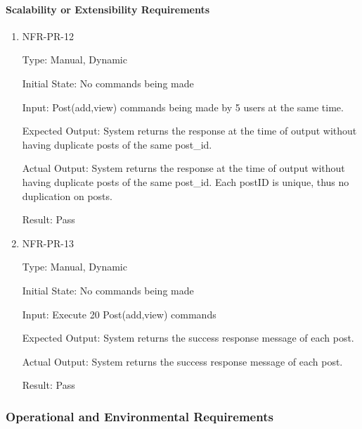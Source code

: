 \documentclass[12pt, titlepage]{article}
\begin{document}
 \paragraph{Scalability or Extensibility Requirements}
\begin{enumerate}
    \item{NFR-PR-12\\}
    
    Type: Manual, Dynamic
    
    Initial State: No commands being made
    
    Input: Post(add,view) commands being made by 5 users at the same time.
    
    Expected Output: System returns the response at the time of output without having duplicate posts of the same post\_id.
    
    Actual Output: System returns the response at the time of output without having duplicate posts of the same post\_id. Each postID is unique, thus no duplication on posts.
    					
    Result: Pass
    
    \item{NFR-PR-13\\}
    
    Type: Manual, Dynamic
    
    Initial State: No commands being made
    
    Input: Execute 20 Post(add,view) commands
    
    Expected Output: System returns the success response message of each post.
    
    Actual Output: System returns the success response message of each post.
    
    Result: Pass
    

 \end{enumerate}  

\subsubsection{Operational and Environmental Requirements}
\end{document}
